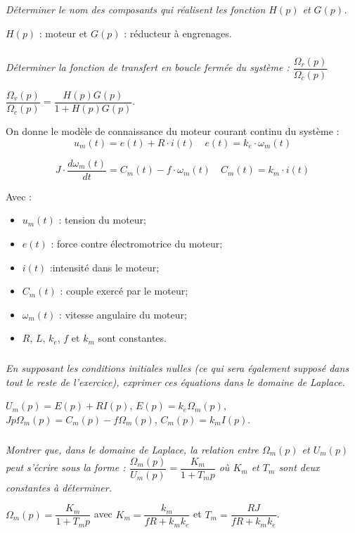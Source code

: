 \documentclass[10pt,fleqn]{article} %
\begin{document}
\begin{multicols}{2}
\fi

\subparagraph{}
\textit{Déterminer le nom des composants qui réalisent les fonction $H(p)$ et $G(p)$.}
\ifprof
\begin{corrige}
$H(p)$ : moteur et $G(p)$ : réducteur à engrenages.
\end{corrige}
\else
\fi

\subparagraph{}
\textit{ Déterminer la fonction de transfert en boucle fermée du système : $\dfrac{\Omega_r(p)}{\Omega_c(p)}$}
\ifprof
\begin{corrige}
$\dfrac{\Omega_v(p)}{\Omega_c(p)}=\dfrac{H(p)G(p)}{1+H(p)G(p)}$.
\end{corrige}
\else
\fi

\ifprof
\else
On donne le modèle de connaissance du moteur courant continu du système :
$$u_m(t) = e(t) + R\cdot i(t) 
\quad e(t) = k_e\cdot \omega_m(t)
$$

$$J\cdot \dfrac{d\omega_m(t)}{dt} = C_m (t) -f\cdot \omega_m(t)
\quad C_m (t) = k_m \cdot i(t)$$


Avec : 
\begin{itemize}
\item $u_m (t)$ : tension du moteur; 
\item $e(t)$ : force contre électromotrice du moteur; 
\item $i(t)$ :intensité dans le moteur;
\item $C_m (t)$ : couple exercé par le moteur;
\item $\omega_m(t)$ : vitesse angulaire du moteur;
\item $R$, $L$, $k_e$, $f$ et $k_m$ sont constantes.
\end{itemize}

\fi

\subparagraph{}
\textit{En supposant les conditions initiales nulles (ce qui sera également supposé dans tout le reste de l'exercice), exprimer ces équations dans le domaine de Laplace. }
\ifprof
\begin{corrige}
$U_m(p) = E(p) + RI(p)$, $E(p) = k_e\Omega_m(p)$, 
$Jp\Omega_m(p) = C_m (p) -f\Omega_m(p)$, $C_m (p) = k_m I(p)$.

\end{corrige}
\else
\fi


\subparagraph{}
\textit{Montrer que, dans le domaine de Laplace, la relation entre $\Omega_m (p)$ et $U_m (p)$ peut s'écrire sous la forme : $\dfrac{\Omega_m(p)}{U_m(p)} = \dfrac{K_m}{1+T_mp} $ où $K_m$ et $T_m$ sont deux constantes à déterminer.}
\ifprof
\begin{corrige}
$\Omega_m(p)=\dfrac{K_m}{1+T_m p}$ avec $K_m=\dfrac{k_m}{fR+k_mk_e}$ et $T_m=\dfrac{RJ}{fR+k_mk_e}$.
\end{corrige}
\else
\fi


\end{multicols}
\end{document}
